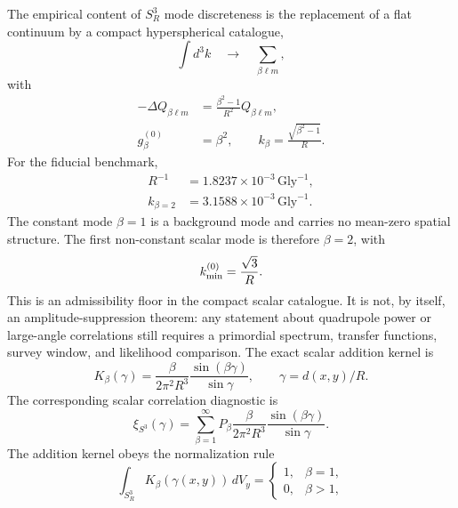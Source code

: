 \documentclass[aps,prd,onecolumn,superscriptaddress,longbibliography,nofootinbib,notitlepage]{revtex4-2}
\begin{document}
The empirical content of $S^3_R$ mode discreteness is the replacement of a flat
continuum by a compact hyperspherical catalogue,
\begin{equation}
  \int d^3k \quad\longrightarrow\quad \sum_{\beta\ell m},
\end{equation}
with
\begin{equation}
\begin{aligned}
  -\Delta Q_{\beta\ell m}
  &=\frac{\beta^2-1}{R^2}Q_{\beta\ell m},\\
  g^{(0)}_\beta&=\beta^2,
  \qquad
  k_\beta=\frac{\sqrt{\beta^2-1}}{R}.
\end{aligned}
\end{equation}
For the fiducial benchmark,
\begin{equation}
\begin{aligned}
  R^{-1}&=1.8237\times10^{-3}\,\mathrm{Gly}^{-1},\\
  k_{\beta=2}&=3.1588\times10^{-3}\,\mathrm{Gly}^{-1}.
\end{aligned}
\end{equation}
The constant mode $\beta=1$ is a background mode and carries no mean-zero spatial
structure. The first non-constant scalar mode is therefore $\beta=2$, with
\begin{equation}
  k_{\rm min}^{(0)}=\frac{\sqrt 3}{R}.
\end{equation}
This is an admissibility floor in the compact scalar catalogue. It is not, by itself,
an amplitude-suppression theorem: any statement about quadrupole power or large-angle
correlations still requires a primordial spectrum, transfer functions, survey window,
and likelihood comparison.
The exact scalar addition kernel is
\begin{equation}
  K_\beta(\gamma)=
  \frac{\beta}{2\pi^2R^3}\frac{\sin(\beta\gamma)}{\sin\gamma},
  \qquad \gamma=d(x,y)/R .
\end{equation}
The corresponding scalar correlation diagnostic is
\begin{equation}
  \xi_{S^3}(\gamma)=
  \sum_{\beta=1}^{\infty}P_\beta
  \frac{\beta}{2\pi^2R^3}\frac{\sin(\beta\gamma)}{\sin\gamma}.
\end{equation}
The addition kernel obeys the normalization rule
\begin{equation}
  \int_{S^3_R}K_\beta(\gamma(x,y))\,dV_y
  =\begin{cases}
  1, & \beta=1,\\
  0, & \beta>1,
  \end{cases}
\end{equation}
\end{document}
